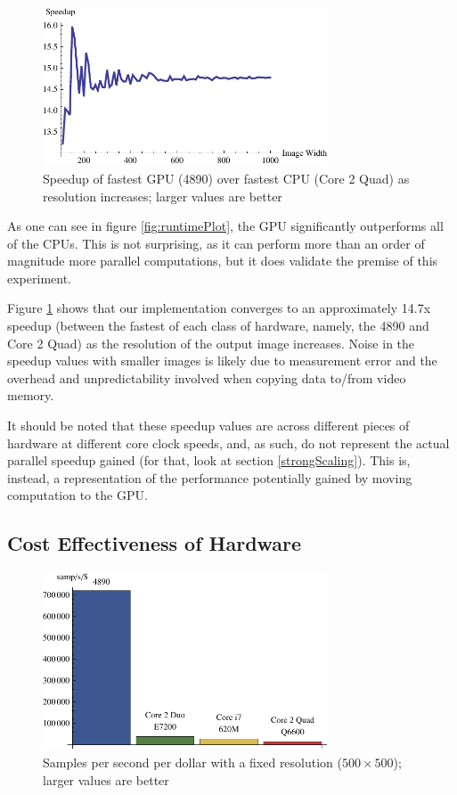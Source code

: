 \documentclass{acmsiggraph}
\begin{document}
\begin{figure}
    \includegraphics[width=84.5mm]{speedupPlot.pdf}
    \caption{Speedup of fastest GPU (4890) over fastest CPU (Core 2 Quad) as resolution increases; larger values are better}
    \label{fig:speedupPlot}
\end{figure}

As one can see in figure \ref{fig:runtimePlot}, the GPU significantly outperforms all of the CPUs. This is not surprising, as it can perform more than an order of magnitude more parallel computations, but it does validate the premise of this experiment.

Figure \ref{fig:speedupPlot} shows that our implementation converges to an approximately 14.7x speedup (between the fastest of each class of hardware, namely, the 4890 and Core 2 Quad) as the resolution of the output image increases. Noise in the speedup values with smaller images is likely due to measurement error and the overhead and unpredictability involved when copying data to/from video memory.

It should be noted that these speedup values are across different pieces of hardware at different core clock speeds, and, as such, do not represent the actual parallel speedup gained (for that, look at section \ref{strongScaling}). This is, instead, a representation of the performance potentially gained by moving computation to the GPU.

\subsection{Cost Effectiveness of Hardware}

\begin{figure}
    \includegraphics[width=84.5mm]{dollarPlot.pdf}
    \caption{Samples per second per dollar with a fixed resolution ($500\times500$); larger values are better}
    \label{fig:costEffectiveness}
\end{figure}
\end{document}
